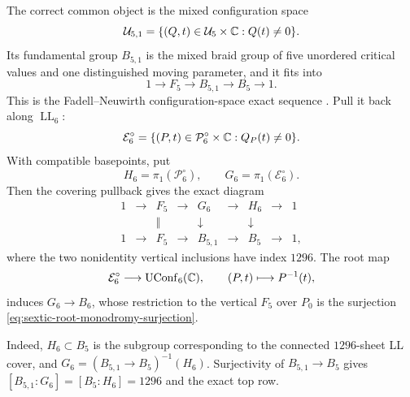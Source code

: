 The correct common object is the mixed configuration space
\begin{equation}
 \mathcal U_{5,1}
 =\{(Q,t)\in\mathcal U_5\times\mathbb{C}:Q(t)\ne0\}.
 \label{eq:mixed-critical-value-configuration}
\end{equation}
Its fundamental group $B_{5,1}$ is the mixed braid group of five unordered
critical values and one distinguished moving parameter, and it fits into
\begin{equation}
 1\longrightarrow F_5\longrightarrow B_{5,1}
 \longrightarrow B_5\longrightarrow1.
 \label{eq:mixed-braid-exact-sequence}
\end{equation}
This is the Fadell--Neuwirth configuration-space exact sequence
\cite{FadellNeuwirth1962ConfigurationSpaces}.
Pull it back along $\operatorname{LL}_6$:
\begin{equation}
 \mathcal E_6^\circ
 =\{(P,t)\in\mathcal P_6^\circ\times\mathbb{C}:Q_P(t)\ne0\}.
 \label{eq:sextic-ll-moving-parameter-space}
\end{equation}
With compatible basepoints, put
\begin{equation}
 H_6=\pi_1(\mathcal P_6^\circ),
 \qquad
 G_6=\pi_1(\mathcal E_6^\circ).
 \label{eq:sextic-two-monodromy-groups}
\end{equation}
Then the covering pullback gives the exact diagram
\begin{equation}
\begin{array}{ccccccccc}
1&\longrightarrow&F_5&\longrightarrow&G_6&\longrightarrow&H_6&\longrightarrow&1\\
 &&\Vert&&\downarrow&&\downarrow&&\\
1&\longrightarrow&F_5&\longrightarrow&B_{5,1}&\longrightarrow&B_5&\longrightarrow&1,
\end{array}
\label{eq:sextic-two-braid-exact-diagram}
\end{equation}
where the two nonidentity vertical inclusions have index $1296$.  The root map
\begin{equation}
 \mathcal E_6^\circ\longrightarrow\operatorname{UConf}_6(\mathbb{C}),
 \qquad
 (P,t)\longmapsto P^{-1}(t),
 \label{eq:sextic-root-configuration-map}
\end{equation}
induces $G_6\to B_6$, whose restriction to the vertical $F_5$ over $P_0$ is
the surjection \eqref{eq:sextic-root-monodromy-surjection}.

Indeed, $H_6\subset B_5$ is the subgroup corresponding to the connected
$1296$-sheet LL cover, and
$G_6=(B_{5,1}\to B_5)^{-1}(H_6)$.  Surjectivity of
$B_{5,1}\to B_5$ gives
$[B_{5,1}:G_6]=[B_5:H_6]=1296$ and the exact top row.

